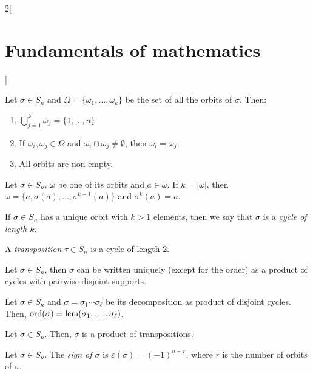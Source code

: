 \documentclass[../../../main.tex]{subfiles}
\begin{document}
\begin{multicols}{2}[\section{Fundamentals of mathematics}]
\begin{definition}
    \end{definition}
    \begin{theorem}
        Let $\sigma\in S_n$ and $\Omega=\{\omega_1,\ldots,\omega_k\}$ be the set of all the orbits of $\sigma$. Then:
        \begin{enumerate}
            \item $\bigcup_{j=1}^k \omega_j=\{1,\ldots,n\}$.
            \item If $\omega_i,\omega_j\in\Omega$ and $\omega_i\cap\omega_j\ne\emptyset$, then $\omega_i=\omega_j$.
            \item All orbits are non-empty.
        \end{enumerate}
    \end{theorem}
    \begin{theorem}
        Let $\sigma\in S_n$, $\omega$ be one of its orbits and $a\in\omega$. If $k=|\omega|$, then $\omega=\{a,\sigma(a),\ldots,\sigma^{k-1}(a)\}$ and $\sigma^k(a)=a$.
    \end{theorem}
    \begin{definition}
        If $\sigma\in S_n$ has a unique orbit with $k>1$ elements, then we say that $\sigma$ is a \textit{cycle of length $k$}. 
    \end{definition}
    \begin{definition}
        A \textit{transposition} $\tau\in S_n$ is a cycle of length 2.
    \end{definition}
    \begin{theorem}
        Let $\sigma\in S_n$, then $\sigma$ can be written uniquely (except for the order) as a product of cycles with pairwise disjoint supports.
    \end{theorem}
    \begin{corollary}
        Let $\sigma\in S_n$ and $\sigma=\sigma_1\cdots\sigma_\ell$ be its decomposition as product of disjoint cycles. Then, $\text{ord}(\sigma)=\operatorname{lcm}(\sigma_1,\ldots,\sigma_\ell)$.
    \end{corollary}
    \begin{corollary}
        Let $\sigma\in S_n$. Then, $\sigma$ is a product of transpositions.
    \end{corollary}
    \begin{definition}
        Let $\sigma\in S_n$. The \textit{sign of $\sigma$} is $\varepsilon(\sigma)=(-1)^{n-r}$, where $r$ is the number of orbits of $\sigma$.
    \end{definition}
    \begin{theorem}

\end{theorem}
\end{multicols}
\end{document}
